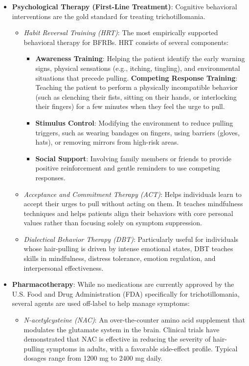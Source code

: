\begin{itemize}
    \item \textbf{Psychological Therapy (First-Line Treatment)}: Cognitive behavioral interventions are the gold standard for treating trichotillomania.
    \begin{itemize}
        \item \textit{Habit Reversal Training (HRT)}: The most empirically supported behavioral therapy for BFRBs. HRT consists of several components:
        \begin{itemize}
            \item \textbf{Awareness Training}: Helping the patient identify the early warning signs, physical sensations (e.g., itching, tingling), and environmental situations that precede pulling.
            \textbf{Competing Response Training}: Teaching the patient to perform a physically incompatible behavior (such as clenching their fists, sitting on their hands, or interlocking their fingers) for a few minutes when they feel the urge to pull.
            \item \textbf{Stimulus Control}: Modifying the environment to reduce pulling triggers, such as wearing bandages on fingers, using barriers (gloves, hats), or removing mirrors from high-risk areas.
            \item \textbf{Social Support}: Involving family members or friends to provide positive reinforcement and gentle reminders to use competing responses.
        \end{itemize}
        \item \textit{Acceptance and Commitment Therapy (ACT)}: Helps individuals learn to accept their urges to pull without acting on them. It teaches mindfulness techniques and helps patients align their behaviors with core personal values rather than focusing solely on symptom suppression.
        \item \textit{Dialectical Behavior Therapy (DBT)}: Particularly useful for individuals whose hair-pulling is driven by intense emotional states, DBT teaches skills in mindfulness, distress tolerance, emotion regulation, and interpersonal effectiveness.
    \end{itemize}
    \item \textbf{Pharmacotherapy}: While no medications are currently approved by the U.S. Food and Drug Administration (FDA) specifically for trichotillomania, several agents are used off-label to help manage symptoms:
    \begin{itemize}
        \item \textit{N-acetylcysteine (NAC)}: An over-the-counter amino acid supplement that modulates the glutamate system in the brain. Clinical trials have demonstrated that NAC is effective in reducing the severity of hair-pulling symptoms in adults, with a favorable side-effect profile. Typical dosages range from 1200 mg to 2400 mg daily.

\end{itemize}
\end{itemize}
